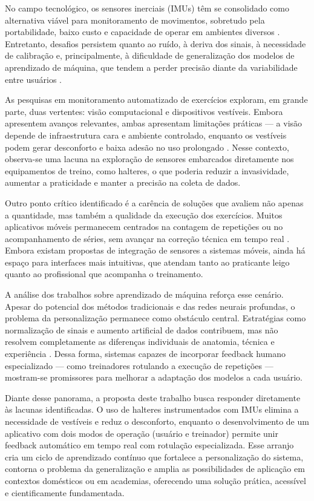 No campo tecnológico, os sensores inerciais (IMUs) têm se consolidado como alternativa viável para monitoramento de movimentos, sobretudo pela portabilidade, baixo custo e capacidade de operar em ambientes diversos \cite{BMI160,dzaja-quantitative-nodate}. Entretanto, desafios persistem quanto ao ruído, à deriva dos sinais, à necessidade de calibração e, principalmente, à dificuldade de generalização dos modelos de aprendizado de máquina, que tendem a perder precisão diante da variabilidade entre usuários \cite{balkhi-multipurpose-nodate}.  

As pesquisas em monitoramento automatizado de exercícios exploram, em grande parte, duas vertentes: visão computacional e dispositivos vestíveis. Embora apresentem avanços relevantes, ambas apresentam limitações práticas — a visão depende de infraestrutura cara e ambiente controlado, enquanto os vestíveis podem gerar desconforto e baixa adesão no uso prolongado \cite{dzaja-quantitative-nodate,gupta-yogahelp-2021}. Nesse contexto, observa-se uma lacuna na exploração de sensores embarcados diretamente nos equipamentos de treino, como halteres, o que poderia reduzir a invasividade, aumentar a praticidade e manter a precisão na coleta de dados.  

Outro ponto crítico identificado é a carência de soluções que avaliem não apenas a quantidade, mas também a qualidade da execução dos exercícios. Muitos aplicativos móveis permanecem centrados na contagem de repetições ou no acompanhamento de séries, sem avançar na correção técnica em tempo real \cite{dzaja-quantitative-nodate}. Embora existam propostas de integração de sensores a sistemas móveis, ainda há espaço para interfaces mais intuitivas, que atendam tanto ao praticante leigo quanto ao profissional que acompanha o treinamento.  

A análise dos trabalhos sobre aprendizado de máquina reforça esse cenário. Apesar do potencial dos métodos tradicionais e das redes neurais profundas, o problema da personalização permanece como obstáculo central. Estratégias como normalização de sinais e aumento artificial de dados contribuem, mas não resolvem completamente as diferenças individuais de anatomia, técnica e experiência \cite{dzaja-quantitative-nodate,xia_volearn_2022}. Dessa forma, sistemas capazes de incorporar feedback humano especializado — como treinadores rotulando a execução de repetições — mostram-se promissores para melhorar a adaptação dos modelos a cada usuário.  

Diante desse panorama, a proposta deste trabalho busca responder diretamente às lacunas identificadas. O uso de halteres instrumentados com IMUs elimina a necessidade de vestíveis e reduz o desconforto, enquanto o desenvolvimento de um aplicativo com dois modos de operação (usuário e treinador) permite unir feedback automático em tempo real com rotulação especializada. Esse arranjo cria um ciclo de aprendizado contínuo que fortalece a personalização do sistema, contorna o problema da generalização e amplia as possibilidades de aplicação em contextos domésticos ou em academias, oferecendo uma solução prática, acessível e cientificamente fundamentada.
